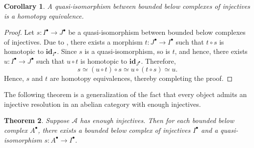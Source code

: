 \documentclass[11pt]{article}
\theoremstyle{thmstyle}
\newtheorem{theorem}{Theorem}[section]
\theoremstyle{defstyle}
\newtheorem{corollary}[theorem]{Corollary}
\newcommand{\id}{\mathbf{id}}
\newcommand{\scrA}{\mathscr{A}}
\begin{document}
\begin{corollary}
	A quasi-isomorphism between bounded below complexes of injectives is a homotopy equivalence.
\end{corollary}
\begin{proof}
	Let $s\colon I^\bullet\to J^\bullet$ be a quasi-isomorphism between bounded below complexes of injectives. Due to , there exists a morphism $t\colon J^\bullet\to I^\bullet$ such that $t\circ s$ is homotopic to $\id_{I^\bullet}$. Since $s$ is a quasi-isomorphism, so is $t$, and hence, there exists $u\colon I^\bullet\to J^\bullet$ such that $u\circ t$ is homotopic to $\id_{J^\bullet}$. Therefore, 
	\begin{equation*}
		s\simeq (u\circ t)\circ s \simeq u\circ(t\circ s)\simeq u.
	\end{equation*}
	Hence, $s$ and $t$ are homotopy equivalences, thereby completing the proof.
\end{proof}

The following theorem is a generalization of the fact that every object admits an injective resolution in an abelian category with enough injectives.

\begin{theorem}
	Suppose $\scrA$ has enough injectives. Then for each bounded below complex $A^\bullet$, there exists a bounded below complex of injectives $I^\bullet$ and a quasi-isomorphism $s\colon A^\bullet\to I^\bullet$.
\end{theorem}
\end{document}
